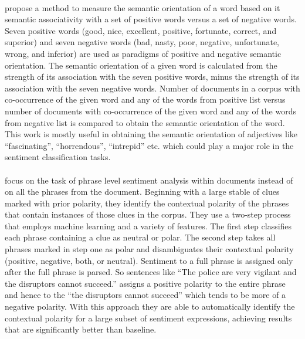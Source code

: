 \documentclass[a4paper,26pt]{article}
\begin{document}
\paragraph{}
\cite{turney2002unsupervised} propose a method to measure the semantic orientation of a word based on it semantic associativity with a set of positive words versus a set of negative words. Seven positive words (good, nice, excellent, positive, fortunate, correct, and superior) and seven negative words (bad, nasty, poor, negative, unfortunate, wrong, and inferior) are used as paradigms of positive and negative semantic orientation. The semantic orientation of a given word is calculated from the strength of its association with the seven positive words, minus the strength of its association with the seven negative words. Number of documents in a corpus with co-occurrence of the given word and any of the words from positive list versus number of documents with co-occurrence of the given word and any of the words from negative list is compared to obtain the semantic orientation of the word. This work is mostly useful in obtaining the semantic orientation of adjectives like ``fascinating'', ``horrendous'', ``intrepid'' etc. which could play a major role in the sentiment classification tasks. 

\paragraph{}
\cite{wilson2005recognizing} focus on the task of phrase level sentiment analysis within documents instead of on all the phrases from the document. Beginning with a large stable of clues marked with prior polarity, they identify the contextual polarity of the phrases that contain instances of those clues in the corpus. They use a two-step process that employs machine learning and a variety of features. The first step classifies each phrase containing a clue as neutral or polar. The second step takes all phrases marked in step one as polar and disambiguates their contextual polarity (positive, negative, both, or neutral). Sentiment to a full phrase is assigned only after the full phrase is parsed. So sentences like ``The police are very vigilant and the disruptors cannot succeed.'' assigns a positive polarity to the entire phrase and hence to the ``the disruptors cannot succeed'' which tends to be more of a negative polarity. With this approach they are able to automatically identify the contextual polarity for a large subset of sentiment expressions, achieving results that are significantly better than baseline.
\end{document}
